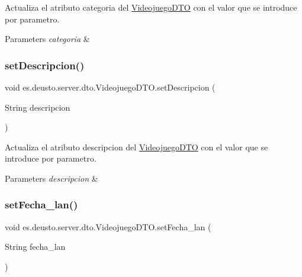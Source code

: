 Actualiza el atributo categoria del \mbox{\hyperlink{classes_1_1deusto_1_1server_1_1dto_1_1_videojuego_d_t_o}{Videojuego\+D\+TO}} con el valor que se introduce por parametro. 
\begin{DoxyParams}{Parameters}
{\em categoria} & \\
\hline
\end{DoxyParams}
\mbox{\label{classes_1_1deusto_1_1server_1_1dto_1_1_videojuego_d_t_o_a6e98b4e05f9df9cbfc4880a717c51de5}} 
\subsubsection{\texorpdfstring{setDescripcion()}{setDescripcion()}}
{\footnotesize\ttfamily void es.\+deusto.\+server.\+dto.\+Videojuego\+D\+T\+O.\+set\+Descripcion (\begin{DoxyParamCaption}\item[{String}]{descripcion }\end{DoxyParamCaption})}

Actualiza el atributo descripcion del \mbox{\hyperlink{classes_1_1deusto_1_1server_1_1dto_1_1_videojuego_d_t_o}{Videojuego\+D\+TO}} con el valor que se introduce por parametro. 
\begin{DoxyParams}{Parameters}
{\em descripcion} & \\
\hline
\end{DoxyParams}
\mbox{\label{classes_1_1deusto_1_1server_1_1dto_1_1_videojuego_d_t_o_a97c24eeac497cdaffe290b623dd4e4de}} 
\subsubsection{\texorpdfstring{setFecha\_lan()}{setFecha\_lan()}}
{\footnotesize\ttfamily void es.\+deusto.\+server.\+dto.\+Videojuego\+D\+T\+O.\+set\+Fecha\+\_\+lan (\begin{DoxyParamCaption}\item[{String}]{fecha\+\_\+lan }\end{DoxyParamCaption})}

